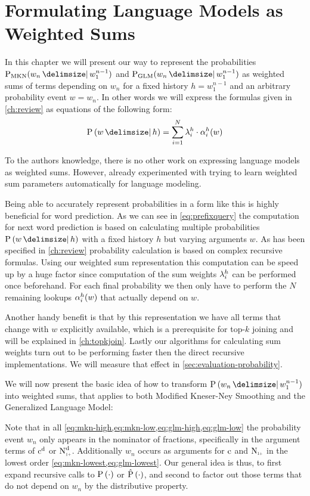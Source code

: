 \chapter{Formulating Language Models as Weighted Sums}
\label{ch:weightedsum}

In this chapter we will present our way to represent the probabilities
$\ProbMKN{w_n}{w_1^{n-1}}$ and $\ProbGLM{w_n}{w_1^{n-1}}$ as weighted sums of
terms depending on $w_n$ for a fixed history $h = w_1^{n-1}$ and an  arbitrary
probability event $w = w_n$.
In other words we will express the formulas given in \cref{ch:review} as
equations of the following form:
\begin{equation}
  \label{eq:weightedsum}
  \Prob{w}{h} = \sum_{i = 1}^{N} \SumWeight_i^h \cdot \SumArg_i^h(w)
\end{equation}

To the authors knowledge, there is no other work on expressing language models
as weighted sums.
However, \textcite{JelinekMercer1980} already experimented with trying to learn
weighted sum parameters automatically for language modeling.

Being able to accurately represent probabilities in a form like this is highly
beneficial for word prediction.
As we can see in \cref{eq:prefixquery} the computation for next word prediction
is based on calculating multiple probabilities $\Prob{w}{h}$ with a fixed
history $h$ but varying arguments $w$.
As has been specified in \cref{ch:review} probability calculation is based on
complex recursive formulas.
Using our weighted sum representation this computation can be speed up by
a huge factor since computation of the sum weights $\lambda^h_i$ can
be performed once beforehand.
For each final probability we then only have to perform the $N$ remaining
lookups $\alpha^h_i(w)$ that actually depend on $w$.

Another handy benefit is that by this representation we have all terms that
change with $w$ explicitly available, which is a prerequisite for top-$k$
joining and will be explained in \cref{ch:topkjoin}.
Lastly our algorithms for calculating sum weights turn out to be performing
faster
then the direct recursive implementations.
We will measure that effect in \cref{sec:evaluation-probability}.

We will now present the basic idea of how to transform $\Prob{w_n}{w_1^{n-1}}$
into weighted sums, that applies to both Modified Kneser-Ney Smoothing and
the Generalized Language Model:

Note that in all \cref{eq:mkn-high,eq:mkn-low,eq:glm-high,eq:glm-low} the
probability event $w_n$ only appears in the nominator of fractions, specifically
in the argument terms of $\DiscountedCount$ or $\DiscountedCount*$.
Additionally $w_n$ occurs as arguments for $\operatorname{c}$ and $\ContCountIp$ in the
lowest order \cref{eq:mkn-lowest,eq:glm-lowest}.
Our general idea is thus, to first expand recursive calls to
$\Prob(\DummyArg)$ or $\Prob*(\DummyArg)$, and second to factor
out those terms that do not depend on $w_n$ by the distributive property.

